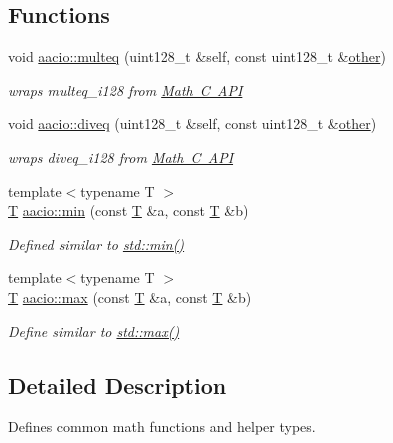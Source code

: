 \subsection*{Functions}
\begin{DoxyCompactItemize}
\item 
void \mbox{\hyperlink{group__mathcppapi_gac2619557a323e4fdb5f2b69a345573e2}{aacio\+::multeq}} (uint128\+\_\+t \&self, const uint128\+\_\+t \&\mbox{\hyperlink{structother}{other}})
\begin{DoxyCompactList}\small\item\em wraps multeq\+\_\+i128 from \mbox{\hyperlink{group__mathcapi}{Math C A\+PI}} \end{DoxyCompactList}\item 
void \mbox{\hyperlink{group__mathcppapi_ga2a55d75a1be6cd50803e1e2905dea277}{aacio\+::diveq}} (uint128\+\_\+t \&self, const uint128\+\_\+t \&\mbox{\hyperlink{structother}{other}})
\begin{DoxyCompactList}\small\item\em wraps diveq\+\_\+i128 from \mbox{\hyperlink{group__mathcapi}{Math C A\+PI}} \end{DoxyCompactList}\item 
{\footnotesize template$<$typename T $>$ }\\\mbox{\hyperlink{struct_t}{T}} \mbox{\hyperlink{group__mathcppapi_gab64c39815d220956e9d2d3c01436e7bc}{aacio\+::min}} (const \mbox{\hyperlink{struct_t}{T}} \&a, const \mbox{\hyperlink{struct_t}{T}} \&b)
\begin{DoxyCompactList}\small\item\em Defined similar to \mbox{\hyperlink{group__mathcppapi_gab64c39815d220956e9d2d3c01436e7bc}{std\+::min()}} \end{DoxyCompactList}\item 
{\footnotesize template$<$typename T $>$ }\\\mbox{\hyperlink{struct_t}{T}} \mbox{\hyperlink{group__mathcppapi_ga1cdad1dcbc2a3d9e6c440342c9bf5769}{aacio\+::max}} (const \mbox{\hyperlink{struct_t}{T}} \&a, const \mbox{\hyperlink{struct_t}{T}} \&b)
\begin{DoxyCompactList}\small\item\em Define similar to \mbox{\hyperlink{group__mathcppapi_ga1cdad1dcbc2a3d9e6c440342c9bf5769}{std\+::max()}} \end{DoxyCompactList}\end{DoxyCompactItemize}


\subsection{Detailed Description}
Defines common math functions and helper types. 



